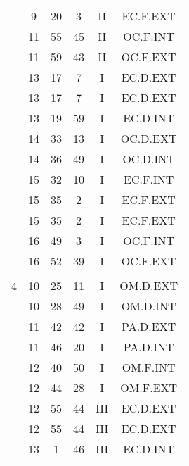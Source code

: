 \documentclass[12pt, a4paper]{article}
\begin{document}
\begin{multicols}{3}
{\begin{tabular}{c c c c c c}
	 	 	 	 & 9 & 20 & 3 & II & EC.F.EXT\\%
	 	 	 	 & 11 & 55 & 45 & II & OC.F.INT\\%
	 	 	 	 & 11 & 59 & 43 & II & OC.F.EXT\\%
	 	 	 	 & 13 & 17 & 7 & I & EC.D.EXT\\%
	 	 	 	 & 13 & 17 & 7 & I & EC.D.EXT\\%
	 	 	 	 & 13 & 19 & 59 & I & EC.D.INT\\%
	 	 	 	 & 14 & 33 & 13 & I & OC.D.EXT\\%
	 	 	 	 & 14 & 36 & 49 & I & OC.D.INT\\%
	 	 	 	 & 15 & 32 & 10 & I & EC.F.INT\\%
	 	 	 	 & 15 & 35 & 2 & I & EC.F.EXT\\%
	 	 	 	 & 15 & 35 & 2 & I & EC.F.EXT\\%
	 	 	 	 & 16 & 49 & 3 & I & OC.F.INT\\%
	 	 	 	 & 16 & 52 & 39 & I & OC.F.EXT\\%
	 	 	 	 & & & & & \\%
	 	 	 	4 & 10 & 25 & 11 & I & OM.D.EXT\\%
	 	 	 	 & 10 & 28 & 49 & I & OM.D.INT\\%
	 	 	 	 & 11 & 42 & 42 & I & PA.D.EXT\\%
	 	 	 	 & 11 & 46 & 20 & I & PA.D.INT\\%
	 	 	 	 & 12 & 40 & 50 & I & OM.F.INT\\%
	 	 	 	 & 12 & 44 & 28 & I & OM.F.EXT\\%
	 	 	 	 & 12 & 55 & 44 & III & EC.D.EXT\\%
	 	 	 	 & 12 & 55 & 44 & III & EC.D.EXT\\%
	 	 	 	 & 13 & 1 & 46 & III & EC.D.INT\\%

\end{tabular}}
\end{multicols}
\end{document}
